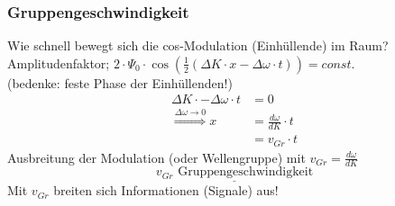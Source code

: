  \subsubsection{Gruppengeschwindigkeit}
 Wie schnell bewegt sich die cos-Modulation (Einhüllende) im Raum?\\
 Amplitudenfaktor; $ 2 \cdot \Psi_0 \cdot \cos(\frac{1}{2}(\Delta K \cdot x - \Delta\omega \cdot t)) = const.$\\
 (bedenke: feste Phase der Einhüllenden!)\\
 \begin{align*}
 	\Delta K \cdot - \Delta\omega\cdot t &= 0\\
 	\overset{\Delta\omega\rightarrow 0}{\Rightarrow} x &= \frac{d\omega}{dK} \cdot t\\
 	&= v_{Gr} \cdot t
 \end{align*}
 Ausbreitung der Modulation (oder Wellengruppe) mit $ v_{Gr} = \frac{d\omega}{dK} $\\
 $$ \underline{v_{Gr} \text{ Gruppengeschwindigkeit}} $$
 Mit $ v_{Gr} $ breiten sich Informationen (Signale) aus!
